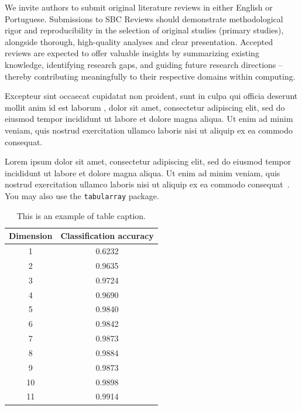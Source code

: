 \documentclass[english]{sbcreviews-2025}%
\begin{document}
We invite authors to submit original literature reviews in either English or Portuguese. Submissions to SBC Reviews should demonstrate methodological rigor and reproducibility in the selection of original studies (primary studies), alongside thorough, high-quality analyses and clear presentation. Accepted reviews are expected to offer valuable insights by summarizing existing knowledge, identifying research gaps, and guiding future research directions – thereby contributing meaningfully to their respective domains within computing. 


Excepteur sint occaecat cupidatat non proident, sunt in culpa qui officia deserunt mollit anim id est laborum \citep{ref3}, dolor sit amet, consectetur adipiscing elit, sed do eiusmod tempor incididunt ut labore et dolore magna aliqua. Ut enim ad minim veniam, quis nostrud exercitation ullamco laboris nisi ut aliquip ex ea commodo consequat.

Lorem ipsum dolor sit amet, consectetur adipiscing elit, sed do eiusmod tempor incididunt ut labore et dolore magna aliqua. Ut enim ad minim veniam, quis nostrud exercitation ullamco laboris nisi ut aliquip ex ea commodo consequat~\citep{ref4}.
You may also use the \texttt{tabularray} package.

\begin{table}[!ht]
\caption{This is an example of table caption.}
\centering
\begin{tabular}{@{}cc@{}}
\hline\hline
Dimension & Classification accuracy \\
\hline%
 1  & 0.6232 \\
 2  & 0.9635 \\ 
 3  & 0.9724 \\ 
 4  & 0.9690 \\ 
 5  & 0.9840 \\ 
 6  & 0.9842 \\ 
 7  & 0.9873 \\ 
 8  & 0.9884 \\
 9  & 0.9873 \\ 
 10 & 0.9898 \\ 
 11 & 0.9914 \\
\hline\hline
\end{tabular}
\label{tab1}
\end{table}
\end{document}
